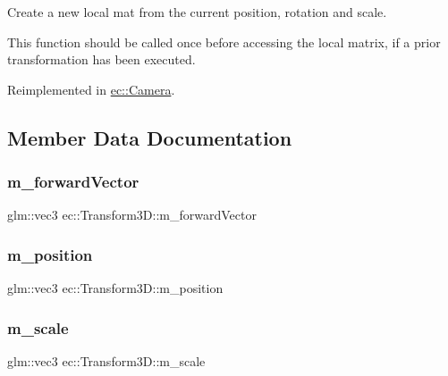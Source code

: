 Create a new local mat from the current position, rotation and scale. 

This function should be called once before accessing the local matrix, if a prior transformation has been executed. 

Reimplemented in \mbox{\hyperlink{classec_1_1_camera_acff95ac4ca039715d67c83111d03b8c1}{ec\+::\+Camera}}.



\subsection{Member Data Documentation}
\mbox{\label{classec_1_1_transform3_d_a5d7ebb5dc842dc73fe0840f3e3f95ab8}} 
\subsubsection{\texorpdfstring{m\+\_\+forward\+Vector}{m\_forwardVector}}
{\footnotesize\ttfamily glm\+::vec3 ec\+::\+Transform3\+D\+::m\+\_\+forward\+Vector\hspace{0.3cm}{\ttfamily [protected]}}

\mbox{\label{classec_1_1_transform3_d_a5bba8c29bb22d2b122b64b51b52335f7}} 
\subsubsection{\texorpdfstring{m\+\_\+position}{m\_position}}
{\footnotesize\ttfamily glm\+::vec3 ec\+::\+Transform3\+D\+::m\+\_\+position\hspace{0.3cm}{\ttfamily [protected]}}

\mbox{\label{classec_1_1_transform3_d_a8eb8cecaa5ec8273e49c9487e0f6b935}} 
\subsubsection{\texorpdfstring{m\+\_\+scale}{m\_scale}}
{\footnotesize\ttfamily glm\+::vec3 ec\+::\+Transform3\+D\+::m\+\_\+scale\hspace{0.3cm}{\ttfamily [protected]}}

